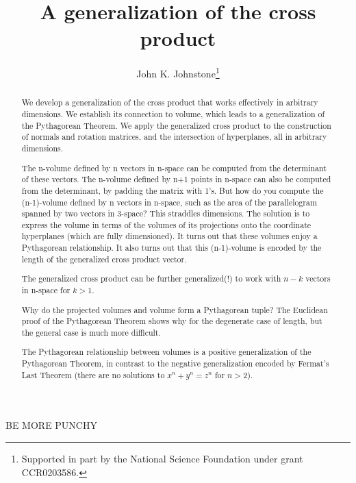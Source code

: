\documentclass[10pt]{article}
\title{A generalization of the cross product}
\author{John K. Johnstone\thanks{Supported in part by the National Science Foundation
        under grant CCR0203586.}}
\newif\iftalk
\begin{document}
\maketitle


BE MORE PUNCHY

\iftalk
What do you get when you cross a mountain climber and a mosquito?
Nothing, you can't cross a scaler and a vector.
\fi

\begin{abstract}
We develop a generalization of the cross product that works effectively in arbitrary dimensions.
We establish its connection to volume, which leads to a generalization of the Pythagorean Theorem.
We apply the generalized cross product to the construction of normals and rotation matrices, and
the intersection of hyperplanes, all in arbitrary dimensions.

The n-volume defined by n vectors in n-space can be computed from the determinant of these vectors.
The n-volume defined by n+1 points in n-space can also be computed from the determinant,
by padding the matrix with 1's.
But how do you compute the (n-1)-volume defined by n vectors in n-space, such as the area
of the parallelogram spanned by two vectors in 3-space?  
This straddles dimensions.
The solution is to express the volume in terms of the volumes of its projections onto the
coordinate hyperplanes (which are fully dimensioned).
It turns out that these volumes enjoy a Pythagorean relationship.
It also turns out that this (n-1)-volume is encoded by the length of the generalized cross
product vector.

The generalized cross product can be further generalized(!) to work with $n-k$ vectors in n-space
for $k>1$.

Why do the projected volumes and volume form a Pythagorean tuple?
The Euclidean proof of the Pythagorean Theorem shows why for the degenerate case of length,
but the general case is much more difficult.

The Pythagorean relationship between volumes is a positive 
generalization of the Pythagorean Theorem,
in contrast to the negative generalization encoded by Fermat's Last Theorem
(there are no solutions to $x^n + y^n = z^n$ for $n>2$).
\end{abstract}

\end{document}
